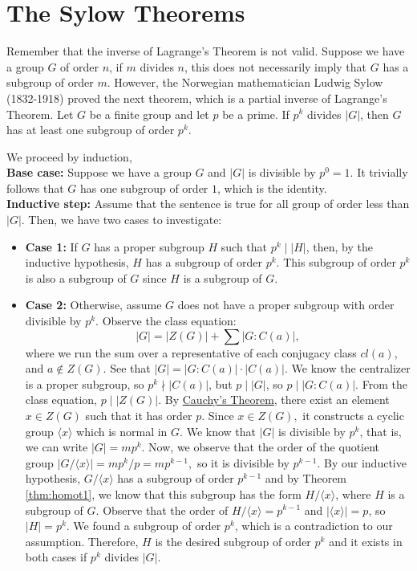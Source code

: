 \documentclass[a4paper,12pt]{article}
\begin{document}
\section{The Sylow Theorems}
Remember that the inverse of Lagrange's Theorem is not valid. Suppose we have a group $G$ of order $n$, if $m$ divides $n$, this does not necessarily imply that $G$ has a subgroup of order $m.$
However, the Norwegian mathematician Ludwig Sylow (1832-1918) proved the next theorem, which is a partial inverse of Lagrange's Theorem.
{
    Let $G$ be a finite group and let $p$ be a prime. If $p^k$ divides $|G|$, then $G$ has at least one subgroup of order $p^k.$
}
{
    We proceed by induction,\\
    \textbf{Base case:} Suppose we have a group $G$ and $|G|$ is divisible by $p^0=1.$ It trivially follows that $G$ has one subgroup of order $1$, which is the identity.
    \\
    \textbf{Inductive step:} Assume that the sentence is true for all group of order less than $|G|.$ Then, we have two cases to investigate:
    \begin{itemize}
        \item \textbf{Case 1:} If $G$ has a proper subgroup $H$ such that $p^k \mid |H|$, then, by the inductive hypothesis, $H$ has a subgroup of order $p^k.$ This subgroup of order $p^k$ is also a subgroup of $G$ since $H$ is a subgroup of $G.$
        \item \textbf{Case 2:} Otherwise, assume $G$ does not have a proper subgroup with order divisible by $p^k.$ Observe the class equation:
        \[|G|=|Z(G)|+\sum|G:C(a)|,\] 
        where we run the sum over a representative of each conjugacy class $cl(a)$, and $a \notin Z(G).$
        See that $|G|=|G:C(a)|\cdot|C(a)|$. We know the centralizer is a proper subgroup, so $p^k \nmid |C(a)|$, but $p \mid |G|$, so $p \mid |G:C(a)|.$ From the class equation, $p \mid |Z(G)|.$ By \hyperref[thm:cauchy]{Cauchy's Theorem}, there exist an element $x \in Z(G)$ such that it has order $p.$ Since $x \in Z(G),$ it constructs a cyclic group $\langle x \rangle$ which is normal in $G.$ 
        We know that $|G|$ is divisible by $p^k$, that is, we can write $|G|=mp^k$. Now, we observe that the order of the quotient group $|G/\langle x\rangle|=mp^k/p=mp^{k-1},$ so it is divisible by $p^{k-1}.$ By our inductive hypothesis, $G/\langle x \rangle$ has a subgroup of order $p^{k-1}$ and by Theorem \ref{thm:homot1}, we know that this subgroup has the form $H / \langle x \rangle$, where $H$ is a subgroup of $G.$ Observe that the order of $H/\langle x \rangle = p^{k-1}$ and $|\langle x \rangle|=p$, so $|H|=p^k$. We found a subgroup of order $p^k$, which is a contradiction to our assumption. Therefore, $H$ is the desired subgroup of order $p^k$ and it exists in both cases if $p^k$ divides $|G|$.\end{itemize}
}
\end{document}
